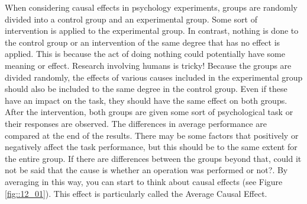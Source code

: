 \documentclass{ltjbook}
\begin{document}
When considering causal effects in psychology experiments, groups are randomly divided into a control group and an experimental group. Some sort of intervention is applied to the experimental group. In contrast, nothing is done to the control group or an intervention of the same degree that has no effect is applied. This is because the act of doing nothing could potentially have some meaning or effect. Research involving humans is tricky! Because the groups are divided randomly, the effects of various causes included in the experimental group should also be included to the same degree in the control group. Even if these have an impact on the task, they should have the same effect on both groups. After the intervention, both groups are given some sort of psychological task or their responses are observed. The differences in average performance are compared at the end of the results. There may be some factors that positively or negatively affect the task performance, but this should be to the same extent for the entire group. If there are differences between the groups beyond that, could it not be said that the cause is whether an operation was performed or not?. By averaging in this way, you can start to think about causal effects (see Figure \ref{fig::12_01}). This effect is particularly called the Average Causal Effect.
\end{document}
